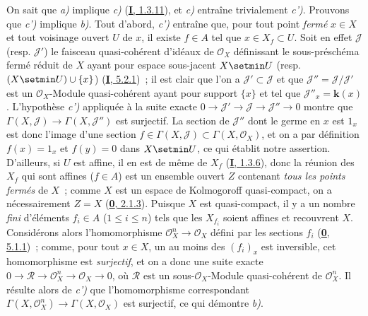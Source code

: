 On sait que \emph{a)} implique \emph{c)} (\hyperref[I.1.3.11-fr]{\textbf{I}, 1.3.11}), et \emph{c)}
entraîne trivialement \emph{c')}. Prouvons que \emph{c')} implique \emph{b)}. Tout d'abord, \emph{c')}
entraîne que, pour tout point \emph{fermé} $x\in X$ et tout voisinage ouvert $U$ de
$x$, il existe $f\in A$ tel que $x\in X_f\subset U$. Soit en effet
$\mathcal{J}$ (resp. $\mathcal{J}'$) le faisceau quasi-cohérent d'idéaux de
$\mathcal{O}_X$ définissant le sous-préschéma fermé réduit de $X$ ayant pour
espace sous-jacent $X\setmin U$ (resp. $(X\setmin U)\cup\{x\}$)
(\hyperref[I.5.2.1-fr]{\textbf{I}, 5.2.1})~; il est clair que l'on a
$\mathcal{J}'\subset\mathcal{J}$ et que
$\mathcal{J}''=\mathcal{J}/\mathcal{J}'$ est un $\mathcal{O}_X$-Module
quasi-cohérent ayant pour support $\{x\}$ et tel que
$\mathcal{J}''_x=\boldsymbol{k}(x)$. L'hypothèse \emph{c')} appliquée à la suite exacte
$0\to\mathcal{J}'\to\mathcal{J}\to\mathcal{J}''\to0$ montre que
$\Gamma(X,\mathcal{J})\to\Gamma(X,\mathcal{J}'')$ est surjectif. La section
de $\mathcal{J}''$ dont le germe en $x$ est $1_x$ est donc l'image d'une
section $f\in\Gamma(X,\mathcal{J})\subset\Gamma(X,\mathcal{O}_X)$, et on a
par définition $f(x)=1_x$ et $f(y)=0$ dans $X\setmin U$, ce qui établit notre
assertion. D'ailleurs, si $U$ est affine, il en est de même de $X_f$
(\hyperref[I.1.3.6-fr]{\textbf{I}, 1.3.6}), donc la réunion des $X_f$ qui sont affines
($f\in A$) est un ensemble ouvert $Z$ contenant \emph{tous les points fermés} de
$X$~; comme $X$ est un espace de Kolmogoroff quasi-compact, on a
nécessairement $Z=X$ (\hyperref[0.2.1.3-fr]{\textbf{0}, 2.1.3}). Puisque $X$ est
quasi-compact, il y a un nombre \emph{fini} d'éléments $f_i\in A$
($1\leq i\leq n$) tels que les $X_{f_i}$ soient affines et recouvrent $X$.
Considérons alors l'homomorphisme $\mathcal{O}_X^n\to\mathcal{O}_X$ défini
par les sections $f_i$ (\hyperref[0.5.1.1-fr]{\textbf{0}, 5.1.1})~; comme, pour tout
$x\in X$, un au moins des $(f_i)_x$ est inversible, cet homomorphisme est
\emph{surjectif}, et on a donc une suite exacte
$0\to\mathcal{R}\to\mathcal{O}_X^n\to\mathcal{O}_X\to0$, où $\mathcal{R}$
est un sous-$\mathcal{O}_X$-Module quasi-cohérent de $\mathcal{O}_X^n$. Il
résulte alors
de \emph{c')} que l'homomorphisme correspondant
$\Gamma(X,\mathcal{O}_X^n)\to\Gamma(X,\mathcal{O}_X)$ est surjectif, ce qui
démontre \emph{b)}.

